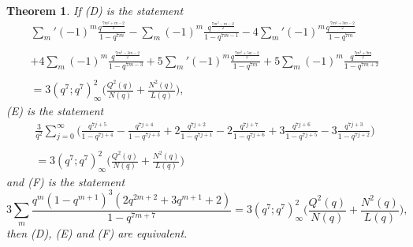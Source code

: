 \documentclass[10pt,reqno]{amsart}
\newtheorem{theorem}{Theorem}[section]
\begin{document}
\begin{theorem}
If (D) is the statement
\begin{multline*}
    \displaystyle\sum_{m}'(-1)^m\displaystyle\frac{q^{\frac{7m^2+m-2}{2}}}{1-q^{7m}}-\displaystyle\sum_{m}(-1)^m\displaystyle\frac{q^{\frac{7m^2-m-2}{2}}}{1-q^{7m-1}}-4\displaystyle\sum_{m}'(-1)^m\displaystyle\frac{q^{\frac{7m^2+3m-2}{2}}}{1-q^{7m}}\\ \\
    +4\displaystyle\sum_{m}(-1)^m\displaystyle\frac{q^{\frac{7m^2-3m-2}{2}}}{1-q^{7m-3}}+5\displaystyle\sum_{m}'(-1)^m\displaystyle\frac{q^{\frac{7m^2+5m-2}{2}}}{1-q^{7m}}+5\displaystyle\sum_{m}(-1)^m\displaystyle\frac{q^{\frac{7m^2+9m}{2}}}{1-q^{7m+2}}\\ \\
    =3(q^7;q^7)_{\infty}^2\Bigg(\displaystyle\frac{Q^2(q)}{N(q)}+\displaystyle\frac{N^2(q)}{L(q)}\Bigg),
\end{multline*}
(E) is the statement 
\begin{multline*}
    \displaystyle\frac{3}{q^2}\displaystyle\sum_{j=0}^{\infty}\Bigg(\displaystyle\frac{q^{7j+5}}{1-q^{7j+4}}-\displaystyle\frac{q^{7j+4}}{1-q^{7j+3}}+2\displaystyle\frac{q^{7j+2}}{1-q^{7j+1}}-2\displaystyle\frac{q^{7j+7}}{1-q^{7j+6}}+3\displaystyle\frac{q^{7j+6}}{1-q^{7j+5}}-3\displaystyle\frac{q^{7j+3}}{1-q^{7j+2}}\Bigg)\\ \\
    =3(q^7;q^7)_{\infty}^2\Bigg(\displaystyle\frac{Q^2(q)}{N(q)}+\displaystyle\frac{N^2(q)}{L(q)}\Bigg)
\end{multline*}
and (F) is the statement
\begin{equation*}
    3\displaystyle\sum_{m}\displaystyle\frac{q^m(1-q^{m+1})^3(2q^{2m+2}+3q^{m+1}+2)}{1-q^{7m+7}}=3(q^7;q^7)_{\infty}^2\Bigg(\displaystyle\frac{Q^2(q)}{N(q)}+\displaystyle\frac{N^2(q)}{L(q)}\Bigg),
\end{equation*}
then (D), (E) and (F) are equivalent.
\end{theorem}
\end{document}
